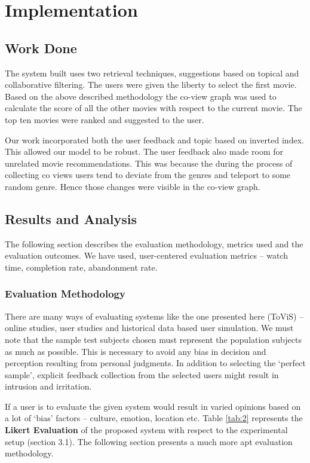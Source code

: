 \chapter{Implementation}

\section{Work Done}
The system built uses two retrieval techniques, suggestions based on topical and collaborative filtering. The users were given the liberty to select the first movie. Based on the above described methodology the co-view graph was used to calculate the score of all the other movies with respect to the current movie. The top ten movies were ranked and suggested to the user. \par
Our work incorporated both the user feedback and topic based on inverted index. This allowed our model to be robust. The user feedback also made room for unrelated movie recommendations. This was because the during the process of collecting co views users tend to deviate from the genres and teleport to some random genre. Hence those changes were visible in the co-view graph.

\section{Results and Analysis}

The following section describes the evaluation methodology, metrics used and the evaluation outcomes. We have used, user-centered evaluation metrics -- watch time, completion rate, abandonment rate.

\subsection{Evaluation Methodology}
There are many ways of evaluating systems like the one presented here (ToViS) -- online studies, user studies and historical data based user simulation. We must note that the sample test subjects chosen must represent the population subjects as much as possible. This is necessary to avoid any bias in decision and perception resulting from personal judgments. In addition to selecting the `perfect sample', explicit feedback collection from the selected users might result in intrusion and irritation.\par
If a user is to evaluate the given system would result in varied opinions based on a lot of `bias' factors -- culture, emotion, location etc. Table \ref{tab:2} represents the \textbf{Likert Evaluation} of the proposed system with respect to the experimental setup (section 3.1). The following section presents a much more apt evaluation methodology.

